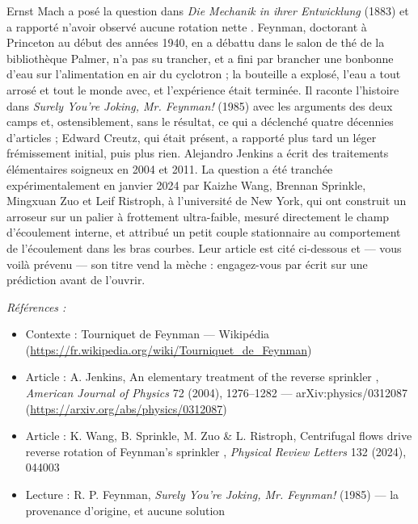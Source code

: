 \documentclass[11pt]{article}
\newenvironment{refs}{\par\small\noindent\emph{Références :}\begin{itemize}\setlength\itemsep{0pt}}{\end{itemize}\normalsize}
\begin{document}
\noindent Ernst Mach a posé la question dans \textit{Die Mechanik in ihrer
Entwicklung} (1883) et a rapporté n'avoir observé \og{} aucune rotation nette \fg{}. Feynman,
doctorant à Princeton au début des années 1940, en a débattu dans le salon de thé de la
bibliothèque Palmer, n'a pas su trancher, et a fini par brancher une bonbonne d'eau sur
l'alimentation en air du cyclotron ; la bouteille a explosé, l'eau a tout arrosé et tout le
monde avec, et l'expérience était terminée. Il raconte l'histoire dans \textit{Surely You're
Joking, Mr. Feynman!} (1985) avec les arguments des deux camps et, ostensiblement, sans le
résultat, ce qui a déclenché quatre décennies d'articles ; Edward Creutz, qui était présent,
a rapporté plus tard un léger frémissement initial, puis plus rien. Alejandro Jenkins a écrit
des traitements élémentaires soigneux en 2004 et 2011. La question a été tranchée
expérimentalement en janvier 2024 par Kaizhe Wang, Brennan Sprinkle, Mingxuan Zuo et Leif
Ristroph, à l'université de New York, qui ont construit un arroseur sur un palier à
frottement ultra-faible, mesuré directement le champ d'écoulement interne, et attribué un
petit couple stationnaire au comportement de l'écoulement dans les bras courbes. Leur article
est cité ci-dessous et --- vous voilà prévenu --- son titre vend la mèche : engagez-vous par écrit
sur une prédiction avant de l'ouvrir.

\begin{refs}
\item Contexte : Tourniquet de Feynman --- Wikipédia (\url{https://fr.wikipedia.org/wiki/Tourniquet_de_Feynman})
\item Article : A. Jenkins, \og{} An elementary treatment of the reverse sprinkler \fg{}, \textit{American Journal of Physics} 72 (2004), 1276--1282 --- arXiv:physics/0312087 (\url{https://arxiv.org/abs/physics/0312087})
\item Article : K. Wang, B. Sprinkle, M. Zuo \& L. Ristroph, \og{} Centrifugal flows drive reverse rotation of Feynman's sprinkler \fg{}, \textit{Physical Review Letters} 132 (2024), 044003
\item Lecture : R. P. Feynman, \textit{Surely You're Joking, Mr. Feynman!} (1985) --- la provenance d'origine, et aucune solution
\end{refs}

\bigskip
\end{document}
